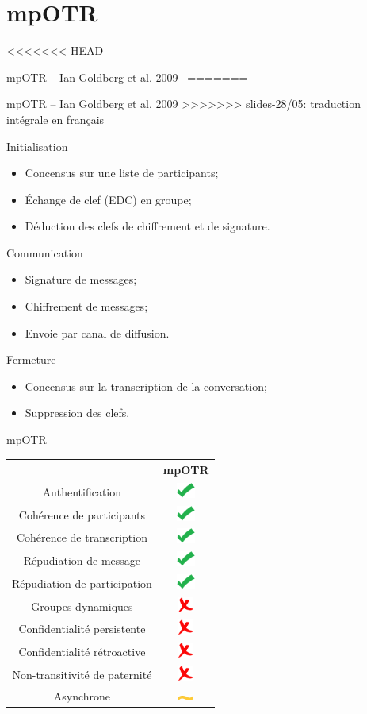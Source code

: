 \documentclass{beamer}
\newcommand{\okay}{\includegraphics[height=0.5cm]{img/check.png}}
\newcommand{\nope}{\includegraphics[height=0.5cm]{img/cross.png}}
\newcommand{\sortof}{\includegraphics[width=0.5cm]{img/tilde.png}}
\begin{document}
\section{mpOTR}
<<<<<<< HEAD
\begin{frame}{mpOTR – Ian Goldberg et al. 2009~\cite{mpotr}}
=======
\begin{frame}{mpOTR -- Ian Goldberg et al. 2009 \cite{mpotr}}
>>>>>>> slides-28/05: traduction intégrale en français
	\begin{block}{Initialisation}
		\begin{itemize}
			\item Concensus sur une liste de participants;
      \item Échange de clef (EDC) en groupe;
			\item Déduction des clefs de chiffrement et de signature.
		\end{itemize}
  \end{block}

	\begin{block}{Communication}
		\begin{itemize}
			\item Signature de messages;
			\item Chiffrement de messages;
      \item Envoie par canal de diffusion.
		\end{itemize}
  \end{block}

	\begin{block}{Fermeture}
		\begin{itemize}
			\item Concensus sur la transcription de la conversation;
			\item Suppression des clefs.
		\end{itemize}
  \end{block}
\end{frame}

\begin{frame}{mpOTR}
	\center
  	\begin{tabular}{c|c}
			                              & mpOTR  \\
			\hline
  		Authentification              & \okay  \\
  		\hline
  		Cohérence de participants     & \okay  \\
  		Cohérence de transcription    & \okay  \\
  		\hline
  		Répudiation de message        & \okay  \\
  		Répudiation de participation  & \okay  \\
  		\hline
  		Groupes dynamiques            & \nope  \\
  		\hline
  		Confidentialité persistente   & \nope  \\
  		Confidentialité rétroactive   & \nope  \\
  		Non-transitivité de paternité & \nope  \\
  		\hline
  		Asynchrone                    & \sortof
    \end{tabular}
\end{frame}



\end{frame}
\end{document}
